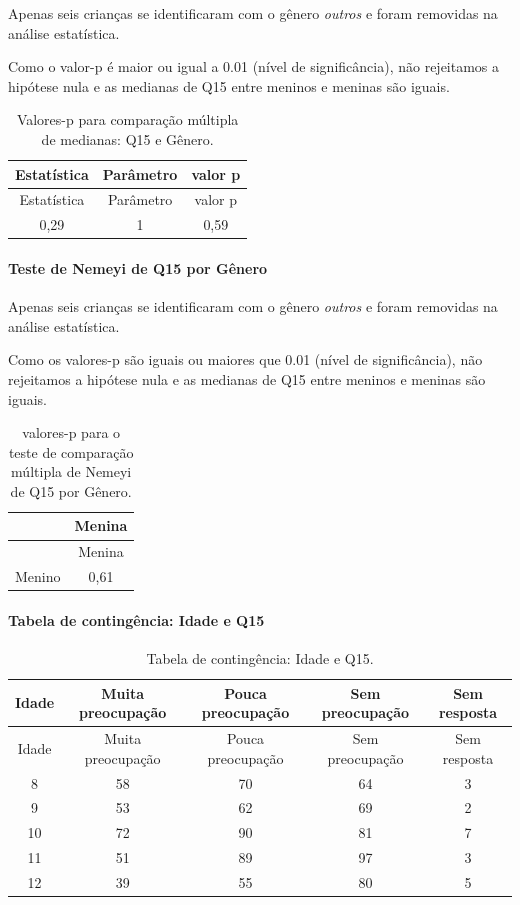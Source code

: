 \documentclass[]{article}
\let\oldparagraph\paragraph
\renewcommand{\paragraph}[1]{\oldparagraph{#1}\mbox{}}
\begin{document}
Apenas seis crianças se identificaram com o gênero \emph{outros} e foram removidas na análise estatística.

Como o valor-p é maior ou igual a 0.01 (nível de significância), não rejeitamos a hipótese nula e as medianas de Q15 entre meninos e meninas são iguais.

\begin{longtable}[]{@{}ccc@{}}
\caption{\label{tab:unnamed-chunk-88}Valores-p para comparação múltipla de medianas: Q15 e Gênero.}\tabularnewline
\toprule
Estatística & Parâmetro & valor p\tabularnewline
\midrule
\endfirsthead
\toprule
Estatística & Parâmetro & valor p\tabularnewline
\midrule
\endhead
0,29 & 1 & 0,59\tabularnewline
\bottomrule
\end{longtable}

\hypertarget{teste-de-nemeyi-de-q15-por-guxeanero}{%
\paragraph{Teste de Nemeyi de Q15 por Gênero}\label{teste-de-nemeyi-de-q15-por-guxeanero}}

Apenas seis crianças se identificaram com o gênero \emph{outros} e foram removidas na análise estatística.

Como os valores-p são iguais ou maiores que 0.01 (nível de significância), não rejeitamos a hipótese nula e as medianas de Q15 entre meninos e meninas são iguais.

\begin{longtable}[]{@{}lc@{}}
\caption{\label{tab:unnamed-chunk-90}valores-p para o teste de comparação múltipla de Nemeyi de Q15 por Gênero.}\tabularnewline
\toprule
& Menina\tabularnewline
\midrule
\endfirsthead
\toprule
& Menina\tabularnewline
\midrule
\endhead
Menino & 0,61\tabularnewline
\bottomrule
\end{longtable}

\cleardoublepage

\hypertarget{tabela-de-continguxeancia-idade-e-q15}{%
\paragraph{Tabela de contingência: Idade e Q15}\label{tabela-de-continguxeancia-idade-e-q15}}

\begin{longtable}[]{@{}ccccc@{}}
\caption{\label{tab:unnamed-chunk-91}Tabela de contingência: Idade e Q15.}\tabularnewline
\toprule
Idade & Muita preocupação & Pouca preocupação & Sem preocupação & Sem resposta\tabularnewline
\midrule
\endfirsthead
\toprule
Idade & Muita preocupação & Pouca preocupação & Sem preocupação & Sem resposta\tabularnewline
\midrule
\endhead
8 & 58 & 70 & 64 & 3\tabularnewline
9 & 53 & 62 & 69 & 2\tabularnewline
10 & 72 & 90 & 81 & 7\tabularnewline
11 & 51 & 89 & 97 & 3\tabularnewline
12 & 39 & 55 & 80 & 5\tabularnewline
\bottomrule
\end{longtable}
\end{document}
